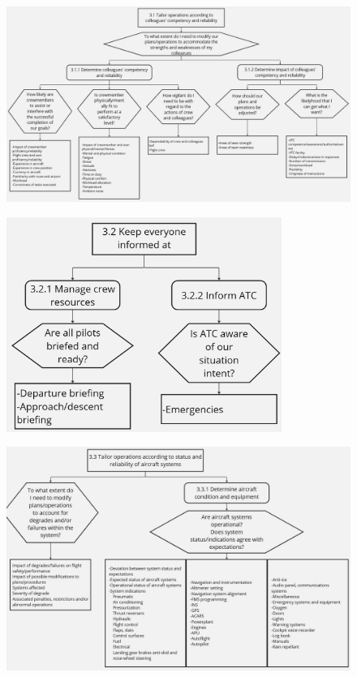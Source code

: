 \documentclass[12pt,a4paper]{article} %
\begin{document}
	\begin{figure}[H]
		\centering
		\includegraphics[width=1.0\textwidth]{./images/GDTA/bott-goal-6.jpg}
		\label{gdta:bott-6}
	\end{figure}

	\begin{figure}[H]
		\centering
		\includegraphics[width=0.8\textwidth]{./images/GDTA/bott-goal-7.jpg}
		\label{gdta:bott-7}
	\end{figure}

	\begin{figure}[H]
		\centering
		\includegraphics[width=1.0\textwidth]{./images/GDTA/bott-goal-8.jpg}
		\label{gdta:bott-8}
	\end{figure}
\end{document}
